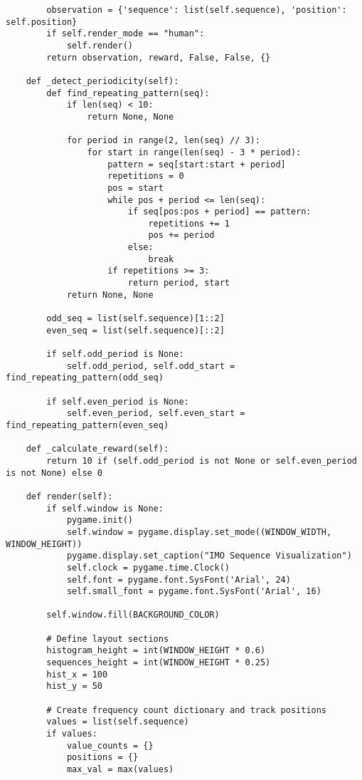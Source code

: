 \begin{lstlisting}
        observation = {'sequence': list(self.sequence), 'position': self.position}
        if self.render_mode == "human":
            self.render()
        return observation, reward, False, False, {}

    def _detect_periodicity(self):
        def find_repeating_pattern(seq):
            if len(seq) < 10:
                return None, None

            for period in range(2, len(seq) // 3):
                for start in range(len(seq) - 3 * period):
                    pattern = seq[start:start + period]
                    repetitions = 0
                    pos = start
                    while pos + period <= len(seq):
                        if seq[pos:pos + period] == pattern:
                            repetitions += 1
                            pos += period
                        else:
                            break
                    if repetitions >= 3:
                        return period, start
            return None, None

        odd_seq = list(self.sequence)[1::2]
        even_seq = list(self.sequence)[::2]

        if self.odd_period is None:
            self.odd_period, self.odd_start = find_repeating_pattern(odd_seq)

        if self.even_period is None:
            self.even_period, self.even_start = find_repeating_pattern(even_seq)

    def _calculate_reward(self):
        return 10 if (self.odd_period is not None or self.even_period is not None) else 0

    def render(self):
        if self.window is None:
            pygame.init()
            self.window = pygame.display.set_mode((WINDOW_WIDTH, WINDOW_HEIGHT))
            pygame.display.set_caption("IMO Sequence Visualization")
            self.clock = pygame.time.Clock()
            self.font = pygame.font.SysFont('Arial', 24)
            self.small_font = pygame.font.SysFont('Arial', 16)

        self.window.fill(BACKGROUND_COLOR)

        # Define layout sections
        histogram_height = int(WINDOW_HEIGHT * 0.6)
        sequences_height = int(WINDOW_HEIGHT * 0.25)
        hist_x = 100
        hist_y = 50

        # Create frequency count dictionary and track positions
        values = list(self.sequence)
        if values:
            value_counts = {}
            positions = {}
            max_val = max(values)


\end{lstlisting}
